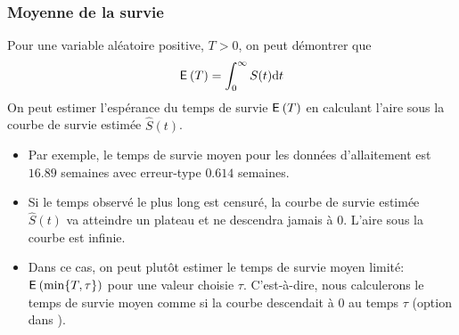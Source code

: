 \documentclass{beamer}
\begin{document}
\begin{frame}
\frametitle{Moyenne de la survie}
Pour une variable aléatoire positive, $T>0$, on peut démontrer que 
\begin{align*}
{\mathsf E}_{}\left(T\right) = \int_0^{\infty} S(t) \mathrm{d} t
\end{align*}
On peut estimer l'espérance du temps de survie ${\mathsf E}_{}\left(T\right)$ en calculant l'aire sous la courbe de survie estimée $\widehat{S}(t)$. 
\begin{itemize}
\item Par exemple, le temps de survie moyen pour les données d'allaitement est $16.89$ semaines avec erreur-type $0.614$ semaines.
\item Si le temps observé le plus long est \alert{censuré}, la courbe de survie estimée $\widehat{S}(t)$ va atteindre un plateau et ne descendra jamais à $0$. L'aire sous la courbe est infinie.
\item Dans ce cas, on peut plutôt estimer le temps de survie moyen limité: ${\mathsf E}_{}\left(\min\{T,\tau\}\right)$ pour une valeur choisie $\tau$. C'est-à-dire, nous calculerons le temps de survie moyen comme si la courbe descendait à $0$ au temps $\tau$ (option  dans \SASlang{}).
\end{itemize} 
\end{frame}
% 
%   
\end{document}
